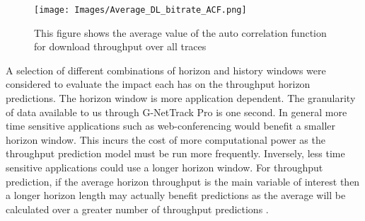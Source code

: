 \begin{figure}[h]
\texttt{[image: Images/Average\_DL\_bitrate\_ACF.png]}
\centering
\caption{This figure shows the average value of the auto correlation function for download throughput over all traces}
\label{fig:dl_acf}
\end{figure}

A selection of different combinations of horizon and history windows were considered to evaluate the impact each has on the throughput horizon predictions. The horizon window is more application dependent. The granularity of data available to us through G-NetTrack Pro is one second. In general more time sensitive applications such as web-conferencing would benefit a smaller horizon window. This incurs the cost of more computational power as the throughput prediction model must be run more frequently. Inversely, less time sensitive applications could use a longer horizon window. For throughput prediction, if the average horizon throughput is the main variable of interest then a longer horizon length may actually benefit predictions as the average will be calculated over a greater number of throughput predictions \cite{raca2019improving}.

